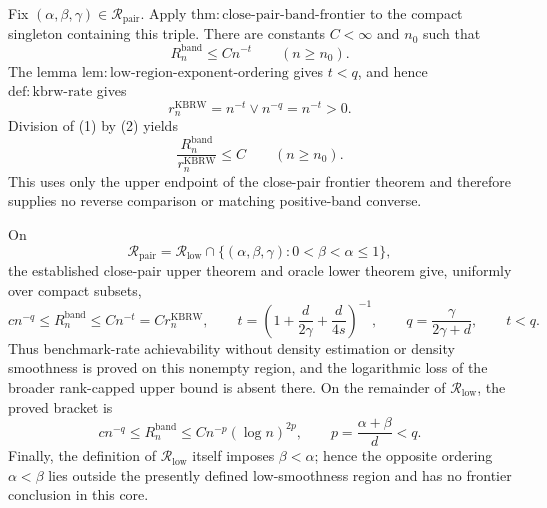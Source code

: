 Fix \((\alpha,\beta,\gamma)\in\mathcal R_{\mathrm{pair}}\).  Apply
\(\mathrm{thm:close\mbox{-}pair\mbox{-}band\mbox{-}frontier}\) to the
compact singleton containing this triple.  There are constants
\(C<\infty\) and \(n_0\) such that
\[
R_n^{\mathrm{band}}\leq Cn^{-t}
\qquad(n\geq n_0).
\tag{1}
\]
The lemma
\(\mathrm{lem:low\mbox{-}region\mbox{-}exponent\mbox{-}ordering}\) gives
\(t<q\), and hence \(\mathrm{def:kbrw\mbox{-}rate}\) gives
\[
r_n^{\mathrm{KBRW}}=n^{-t}\vee n^{-q}=n^{-t}>0.
\tag{2}
\]
Division of (1) by (2) yields
\[
\frac{R_n^{\mathrm{band}}}{r_n^{\mathrm{KBRW}}}\leq C
\qquad(n\geq n_0).
\]
This uses only the upper endpoint of the close-pair frontier theorem and
therefore supplies no reverse comparison or matching positive-band converse.

On
\[
\mathcal R_{\mathrm{pair}}
=\mathcal R_{\mathrm{low}}\cap
\{(\alpha,\beta,\gamma):0<\beta<\alpha\leq1\},
\]
the established close-pair upper theorem and oracle lower theorem give,
uniformly over compact subsets,
\[
c n^{-q}\leq R_n^{\mathrm{band}}
\leq C n^{-t}=C r_n^{\mathrm{KBRW}},
\qquad
t=\left(1+\frac d{2\gamma}+\frac d{4s}\right)^{-1},
\qquad
q=\frac{\gamma}{2\gamma+d},
\qquad t<q.
\]
Thus benchmark-rate achievability without density estimation or density
smoothness is proved on this nonempty region, and the logarithmic loss of the
broader rank-capped upper bound is absent there.  On the remainder of
\(\mathcal R_{\mathrm{low}}\), the proved bracket is
\[
c n^{-q}\leq R_n^{\mathrm{band}}
\leq Cn^{-p}(\log n)^{2p},
\qquad
p=\frac{\alpha+\beta}{d}<q.
\]
Finally, the definition of \(\mathcal R_{\mathrm{low}}\) itself imposes
\(\beta<\alpha\); hence the opposite ordering \(\alpha<\beta\) lies outside
the presently defined low-smoothness region and has no frontier conclusion in
this core.
